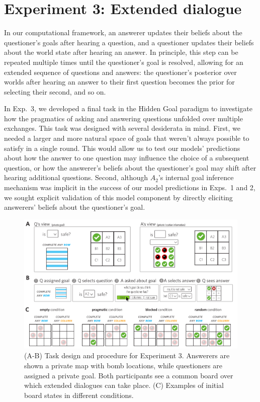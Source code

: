 \documentclass[11pt, floatsintext]{apa6}
\begin{document}
\section{Experiment 3: Extended dialogue}

In our computational framework, an answerer updates their beliefs about the questioner's goals after hearing a question, and a questioner updates their beliefs about the world state after hearing an answer. 
In principle, this step can be repeated multiple times until the questioner's goal is resolved, allowing for an extended sequence of questions and answers: the questioner's posterior over worlds after hearing an answer to their first question becomes the prior for selecting their second, and so on.

In Exp.~3, we developed a final task in the Hidden Goal paradigm to investigate how the pragmatics of asking and answering questions unfolded over multiple exchanges.
This task was designed with several desiderata in mind.
First, we needed a larger and more natural space of goals that weren't always possible to satisfy in a single round.
This would allow us to test our models' predictions about how the answer to one question may influence the choice of a subsequent question, or how the answerer's beliefs about the questioner's goal may shift after hearing additional questions.
Second, although $A_2$'s internal goal inference mechanism was implicit in the success of our model predictions in Exps.~1 and 2, we sought explicit validation of this model component by directly eliciting answerers' beliefs about the questioner's goal.

\begin{figure}[tbh!]
\begin{center}
\includegraphics[scale = .7]{Exp3/spatialDemo.pdf}
\end{center}
\caption{(A-B) Task design and procedure for Experiment 3. Answerers are shown a private map with bomb locations, while questioners are assigned a private goal. Both participants see a common board over which extended dialogues can take place. (C) Examples of initial board states in different conditions.}
\label{fig:exp3task}
\end{figure}
\end{document}

